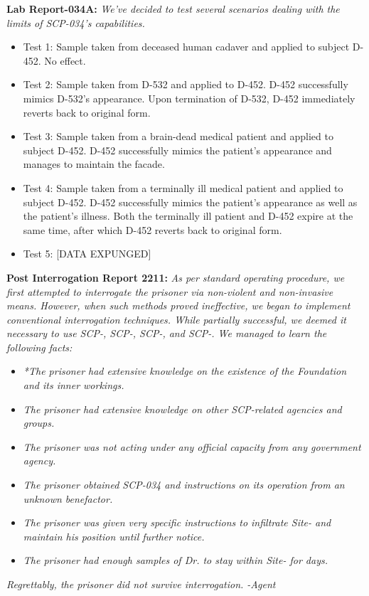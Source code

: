 \textbf{Lab Report-034A:} \textsl{We've decided to test several scenarios dealing with the limits of SCP-034's capabilities.}
\begin{itemize}
\item Test 1: Sample taken from deceased human cadaver and applied to subject D-452. No effect.

\item Test 2: Sample taken from D-532 and applied to D-452. D-452 successfully mimics D-532's appearance. Upon termination of D-532, D-452 immediately reverts back to original form.

\item Test 3: Sample taken from a brain-dead medical patient and applied to subject D-452. D-452 successfully mimics the patient's appearance and manages to maintain the facade.

\item Test 4: Sample taken from a terminally ill medical patient and applied to subject D-452. D-452 successfully mimics the patient's appearance as well as the patient's illness. Both the terminally ill patient and D-452 expire at the same time, after which D-452 reverts back to original form.

\item Test 5: [DATA EXPUNGED]
\end{itemize}
\newpage
\textbf{Post Interrogation Report 2211:}
\textsl{As per standard operating procedure, we first attempted to interrogate the prisoner via non-violent and non-invasive means. However, when such methods proved ineffective, we began to implement conventional interrogation techniques. While partially successful, we deemed it necessary to use SCP-, SCP-, SCP-, and SCP-. We managed to learn the following facts:}
\begin{itemize}
\item \textsl{*The prisoner had extensive knowledge on the existence of the Foundation and its inner workings.}
\item \textsl{The prisoner had extensive knowledge on other SCP-related agencies and groups.}
\item \textsl{The prisoner was not acting under any official capacity from any government agency.}
\item \textsl{The prisoner obtained SCP-034 and instructions on its operation from an unknown benefactor.}
\item \textsl{The prisoner was given very specific instructions to infiltrate Site- and maintain his position until further notice.}
\item \textsl{The prisoner had enough samples of Dr.  to stay within Site- for  days.}
\end{itemize}
\textsl{Regrettably, the prisoner did not survive interrogation. -Agent }
